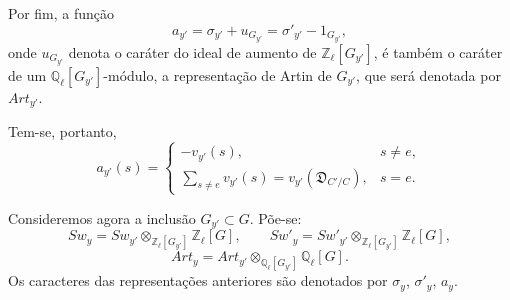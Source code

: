 Por fim, a função
\[
a_{y'}=\sigma_{y'}+u_{G_{y'}}=\sigma'_{y'}-1_{G_{y'}},
\tag{4.2.5}
\]
onde $u_{G_{y'}}$ denota o caráter do ideal de aumento de $\mathbb Z_\ell[G_{y'}]$, é também o caráter de um $\mathbb Q_\ell[G_{y'}]$-módulo, a representação de Artin de $G_{y'}$, que será denotada por $Art_{y'}$.

Tem-se, portanto,
\[
a_{y'}(s)=
\begin{cases}
-v_{y'}(s),& s\ne e,\\[0.4em]
\displaystyle\sum_{s\ne e}v_{y'}(s)=v_{y'}(\mathfrak D_{C'/C}),& s=e.
\end{cases}
\tag{4.2.6}
\]

Consideremos agora a inclusão $G_{y'}\subset G$. Põe-se:
\[
Sw_y=Sw_{y'}\otimes_{\mathbb Z_\ell[G_{y'}]}\mathbb Z_\ell[G],
\qquad
Sw'_y=Sw'_{y'}\otimes_{\mathbb Z_\ell[G_{y'}]}\mathbb Z_\ell[G],
\tag{4.2.7}
\]
\[
Art_y=Art_{y'}\otimes_{\mathbb Q_\ell[G_{y'}]}\mathbb Q_\ell[G].
\tag{4.2.8}
\]
Os caracteres das representações anteriores são denotados por $\sigma_y$, $\sigma'_y$, $a_y$.

